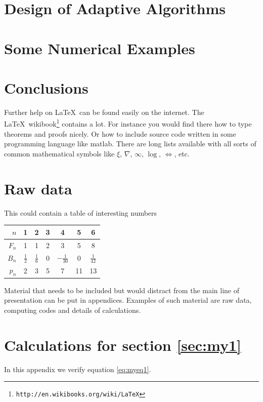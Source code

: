 \documentclass{uonmathreport}
\theoremstyle{definition}
\theoremstyle{problem}
\theoremstyle{theorem}
\begin{document}
\newpage

\section{Design of Adaptive Algorithms} \label{sec:Adaptive}

\newpage

\section{Some Numerical Examples} \label{sec:Examples}

\newpage


\section{Conclusions} \label{sec:conclusions}

Further help on \LaTeX\ can be found easily on the internet. The \LaTeX\
wikibook\footnote{\tt http://en.wikibooks.org/wiki/LaTeX} contains a lot.
For instance you would find there how to type theorems and proofs nicely.
Or how to include source code written in some programming language like
matlab. There are long lists available with all sorts of common
mathematical symbols like $\xi$, $\nabla$, $\infty$, $\log$, $\iff$, etc.

\newpage

\appendix

\section{Raw data} \label{app:rawdata}

This could contain a table of interesting numbers
\begin{center}
  \begin{tabular}{r|cccccc}
    $n$   & 1 & 2 & 3 & 4 & 5 & 6 \\ \hline
    $F_n$ & 1 & 1 & 2 & 3 & 5 & 8 \\
    $B_n$ & $\tfrac{1}{2}$ & $\tfrac{1}{6}$ & 0 & $-\tfrac{1}{30}$ & 0 &  $\tfrac{1}{42}$ \\
    $p_n$ & 2 & 3& 5& 7 & 11 & 13 \\
  \end{tabular}
\end{center}

Material that needs to be included but would distract from the main
line of presentation can be put in appendices.
Examples of such material are raw
data, computing codes and details of calculations.


\section{Calculations for section \ref{sec:my1}} \label{app:calculations}

In this appendix we verify equation \eqref{eq:myeq1}.

\newpage

	
	
\end{document}
